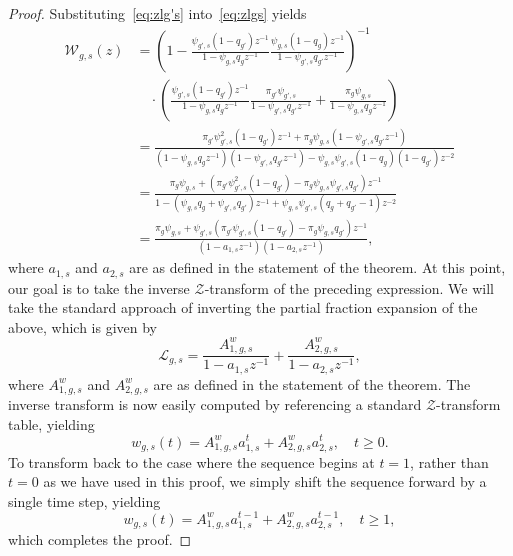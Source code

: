 \documentclass[letterpaper]{article} %
\begin{document}
\begin{proof}
Substituting~\eqref{eq:zlg's} into~\eqref{eq:zlgs} yields
\begin{align*}
    \mathcal{W}_{g,s}(z) &= \left( 1 - \frac{\psi_{g',s}(1-q_{g'})z^{-1}}{1 - \psi_{g,s}q_gz^{-1}} \frac{\psi_{g,s}(1-q_{g})z^{-1}}{1 - \psi_{g',s}q_{g'}z^{-1}} \right)^{-1} \\
    &\quad \cdot \left(\frac{\psi_{g',s}(1-q_{g'})z^{-1}}{1 - \psi_{g,s}q_gz^{-1}}\frac{ \pi_{g'} \psi_{g',s}}{1 - \psi_{g',s}q_{g'}z^{-1}} +  \frac{ \pi_g \psi_{g,s}}{1 - \psi_{g,s}q_gz^{-1}} \right) \\
    &= \frac{ \pi_{g'} \psi_{g',s}^2(1-q_{g'})z^{-1} + \pi_g \psi_{g,s} (1 - \psi_{g',s}q_{g'}z^{-1})}{(1 - \psi_{g,s}q_gz^{-1})(1 - \psi_{g',s}q_{g'}z^{-1}) - \psi_{g,s}\psi_{g',s}(1-q_{g})(1-q_{g'})z^{-2}} \\
    &= \frac{\pi_g \psi_{g,s} + \left( \pi_{g'} \psi_{g',s}^2(1-q_{g'}) -  \pi_g \psi_{g,s}\psi_{g',s}q_{g'}\right)z^{-1} }{1 - (\psi_{g,s}q_g + \psi_{g',s}q_{g'})z^{-1} + \psi_{g,s}\psi_{g',s}(q_{g} + q_{g'} - 1)z^{-2}}  \\
    &= \frac{ \pi_g \psi_{g,s} + \psi_{g',s}\left( \pi_{g'} \psi_{g',s}(1-q_{g'}) - \pi_g\psi_{g,s} q_{g'}\right)z^{-1} }{(1 - a_{1,s} z^{-1})(1 - a_{2,s} z^{-1})}, 
\end{align*}
where $a_{1,s}$ and $a_{2,s}$ are as defined in the statement of the theorem. At this point, our goal is to take the inverse $\mathcal{Z}$-transform of the preceding expression. We will take the standard approach of inverting the partial fraction expansion of the above, which is given by
\begin{equation*}
    \mathcal{L}_{g,s} = \frac{A_{1,g,s}^w}{1-a_{1,s} z^{-1}} + \frac{A_{2,g,s}^w}{1 - a_{2,s} z^{-1}},
\end{equation*}
where $A_{1,g,s}^w$ and $A_{2,g,s}^w$ are as defined in the statement of the theorem.
The inverse transform is now easily computed by referencing a standard $\mathcal{Z}$-transform table, yielding
\begin{equation*}
    w_{g,s}(t) = 
    A_{1,g,s}^wa_{1,s}^t + A_{2,g,s}^wa_{2,s}^t, \quad  t\geq 0.
\end{equation*}
To transform back to the case where the sequence begins at $t=1$, rather than $t=0$ as we have used in this proof, we simply shift the sequence forward by a single time step, yielding
\begin{equation*}
    w_{g,s}(t) = 
    A_{1,g,s}^wa_{1,s}^{t-1} + A_{2,g,s}^wa_{2,s}^{t-1}, \quad  t\geq 1,
\end{equation*}
which completes the proof.
\end{proof}
\end{document}
